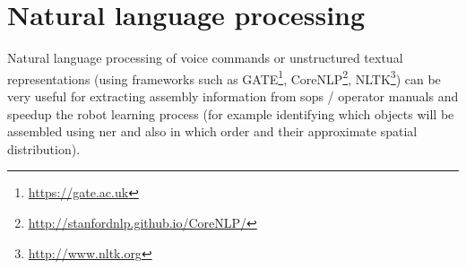 %



\section{Natural language processing}

Natural language processing \cite{Manning1999,Jurafsky2000,Manning2008} of voice commands or unstructured textual representations (using frameworks such as GATE\footnote{\url{https://gate.ac.uk}}, CoreNLP\footnote{\url{http://stanfordnlp.github.io/CoreNLP/}}, NLTK\footnote{\url{http://www.nltk.org}}) can be very useful for extracting assembly information from \glspl{sop} / operator manuals and speedup the robot learning process \cite{Tenorth2010,Stenmark2013,Stenmark2014,Stenmark2016} (for example identifying which objects will be assembled using \gls{ner} \cite{Ekbal2012,Rami2014} and also in which order and their approximate spatial distribution).





